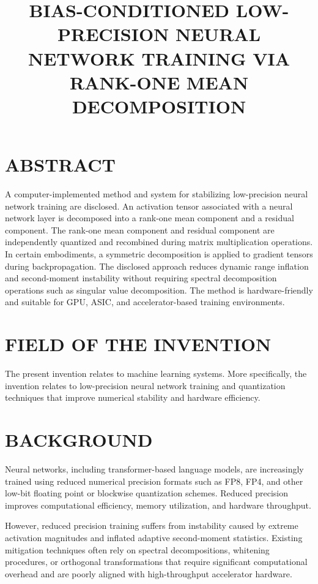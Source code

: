\documentclass[12pt]{article}
\title{\bf BIAS-CONDITIONED LOW-PRECISION NEURAL NETWORK TRAINING VIA RANK-ONE MEAN DECOMPOSITION}
\author{}
\date{}
\begin{document}
\maketitle

\section*{ABSTRACT}

A computer-implemented method and system for stabilizing low-precision neural network training are disclosed. An activation tensor associated with a neural network layer is decomposed into a rank-one mean component and a residual component. The rank-one mean component and residual component are independently quantized and recombined during matrix multiplication operations. In certain embodiments, a symmetric decomposition is applied to gradient tensors during backpropagation. The disclosed approach reduces dynamic range inflation and second-moment instability without requiring spectral decomposition operations such as singular value decomposition. The method is hardware-friendly and suitable for GPU, ASIC, and accelerator-based training environments.

\newpage

\section{FIELD OF THE INVENTION}

The present invention relates to machine learning systems. More specifically, the invention relates to low-precision neural network training and quantization techniques that improve numerical stability and hardware efficiency.

\section{BACKGROUND}

Neural networks, including transformer-based language models, are increasingly trained using reduced numerical precision formats such as FP8, FP4, and other low-bit floating point or blockwise quantization schemes. Reduced precision improves computational efficiency, memory utilization, and hardware throughput.

However, reduced precision training suffers from instability caused by extreme activation magnitudes and inflated adaptive second-moment statistics. Existing mitigation techniques often rely on spectral decompositions, whitening procedures, or orthogonal transformations that require significant computational overhead and are poorly aligned with high-throughput accelerator hardware.
\end{document}

